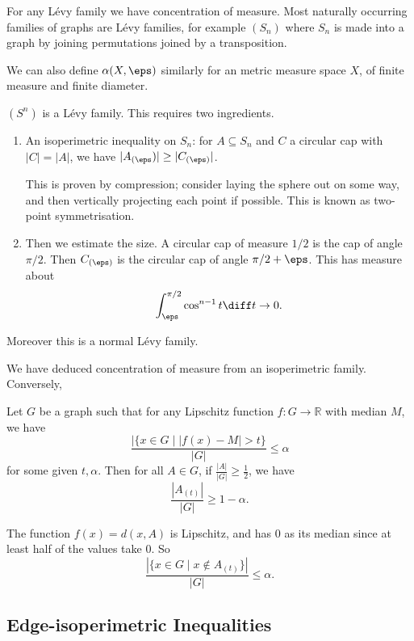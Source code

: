 \documentclass[12pt]{article}
\begin{document}
For any L\'evy family we have concentration of measure. Most naturally occurring families of graphs are L\'evy families, for example $(S_n)$ where $S_n$ is made into a graph by joining permutations joined by a transposition.

We can also define $\alpha(X, \eps)$ similarly for an metric measure space $X$, of finite measure and finite diameter.

\begin{exbox}
	$(S^{n})$ is a L\'evy family. This requires two ingredients.
	\begin{enumerate}
		\item An isoperimetric inequality on $S_n$: for $A \subseteq S_n$ and $C$ a circular cap with $|C| = |A|$, we have $|A_{(\eps})| \geq |C_{(\eps)}|$.

			This is proven by compression; consider laying the sphere out on some way, and then vertically projecting each point if possible. This is known as two-point symmetrisation.
		\item Then we estimate the size. A circular cap of measure $1/2$ is the cap of angle $\pi/2$. Then $C_{(\eps)}$ is the circular cap of angle $\pi/2 + \eps$. This has measure about
			\[
			\int_\eps^{\pi/2} \cos^{n-1}t \diff t \to 0.
			\]
	\end{enumerate}
	Moreover this is a normal L\'evy family.
\end{exbox}

We have deduced concentration of measure from an isoperimetric family. Conversely,

\begin{proposition}
	Let $G$ be a graph such that for any Lipschitz function $f : G  \to \mathbb{R}$ with median $M$, we have
	\[
		\frac{|\{x \in G \mid |f(x) - M| > t\}}{|G|} \leq \alpha
	\]
	for some given $t, \alpha$. Then for all $A \in G$, if $\frac{|A|}{|G|} \geq \frac{1}{2}$, we have
	\[
	\frac{|A_{(t)}|}{|G|} \geq 1 - \alpha.
	\]
\end{proposition}

\begin{proofbox}
	The function $f(x) = d(x, A)$ is Lipschitz, and has $0$ as its median since at least half of the values take $0$. So
	\[
		\frac{|\{x \in G \mid x \not \in A_{(t)}\}|}{|G|} \leq \alpha.
	\]
\end{proofbox}


\subsection{Edge-isoperimetric Inequalities}%
\label{sub:eip}
\end{document}
